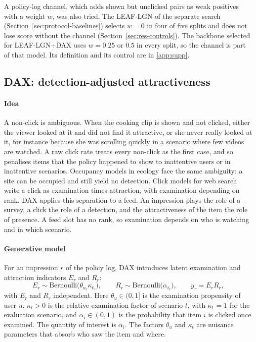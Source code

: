 \documentclass[preprint,12pt,authoryear]{elsarticle}
\begin{document}
A policy-log channel, which adds shown but unclicked pairs as weak positives with a weight $w$, was also tried. The LEAF-LGN of the separate search (Section~\ref{sec:protocol-baselines}) selects $w=0$ in four of five splits and
does not lose score without the channel (Section~\ref{sec:res-controls}). The backbone selected for LEAF-LGN+DAX uses $w=0.25$ or
$0.5$ in every split, so the channel is part of that model. Its definition and
its control are in \ref{app:supp}.

\subsection{DAX: detection-adjusted attractiveness}
\label{sec:method-dax}

\paragraph{Idea} A non-click is ambiguous. When the cooking clip is shown and not clicked, either the viewer looked at it and did not find
it attractive, or she never really looked at it, for instance because she was scrolling quickly in a scenario where few videos are watched.
A raw click rate treats every non-click as the first case, and so penalises items that the policy happened to show to inattentive users or
in inattentive scenarios. Occupancy models in ecology \citep{mackenzie2002occupancy} face the same ambiguity: a site can be occupied and still
yield no detection. Click models for web search \citep{richardson2007predicting,craswell2008cascade,chuklin2015clickmodels} write a click as
examination times attraction, with examination depending on rank. DAX applies this separation to a feed. An impression plays the role of a
survey, a click the role of a detection, and the attractiveness of the item the role of presence. A feed slot has no rank, so examination
depends on who is watching and in which scenario.

\paragraph{Generative model} For an impression $r$ of the policy log, DAX introduces latent examination and attraction indicators $E_r$ and
$R_r$:
\begin{equation}
  E_r\sim\mathrm{Bernoulli}\bigl(\theta_{u_r}\kappa_{t_r}\bigr),\qquad
  R_r\sim\mathrm{Bernoulli}\bigl(\alpha_{i_r}\bigr),\qquad
  y_r=E_rR_r ,
  \label{eq:dax-model}
\end{equation}
with $E_r$ and $R_r$ independent. Here $\theta_u\in(0,1]$ is the examination propensity of user $u$, $\kappa_t>0$ is the relative
examination factor of scenario $t$, with $\kappa_1=1$ for the evaluation scenario, and $\alpha_i\in(0,1)$ is the probability that item $i$
is clicked once examined. The quantity of interest is $\alpha_i$. The factors $\theta_u$ and $\kappa_t$ are nuisance parameters that
absorb who saw the item and where.
\end{document}
